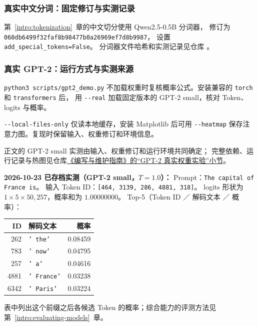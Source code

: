 \subsubsection*{真实中文分词：固定修订与实测记录}
\label{app:tokenizer-record}

第~\ref*{intro:tokenization}~章的中文切分使用 Qwen2.5-0.5B 分词器，
修订为 \nolinkurl{060db6499f32faf8b98477b0a26969ef7d8b9987}，
设置 \texttt{add\_special\_tokens=False}。
分词器文件哈希和实测记录见仓库 。

\subsubsection*{真实 GPT-2：运行方式与实测来源}

\texttt{python3 scripts/gpt2\_demo.py}
不加载权重时复核概率公式。安装兼容的 \texttt{torch} 和 \texttt{transformers} 后，
用 \texttt{-{}-real} 加载固定版本的 GPT-2 small，核对 Token、logits 与概率。

\texttt{-{}-local-files-only} 仅读本地缓存，安装 Matplotlib 后可用
\texttt{-{}-heatmap} 保存注意力图。复现时保留输入、权重修订和环境信息。

正文的 GPT-2 small 实测由输入、权重修订和运行环境共同确定；
完整依赖、运行记录与热图见仓库\href{https://github.com/CoCoThink/ai-by-intuition/blob/main/CONTRIBUTING.md\#gpt-2-\%E7\%9C\%9F\%E5\%AE\%9E\%E6\%9D\%83\%E9\%87\%8D\%E5\%AE\%9E\%E9\%AA\%8C}{《编写与维护指南》的“GPT-2 真实权重实验”小节}。

\textbf{2026-10-23 已存档实测（GPT-2 small，$T=1.0$）：}
Prompt：\texttt{The capital of France is}。
输入 Token ID：\texttt{[464, 3139, 286, 4881, 318]}。
logits 形状为 $1\times5\times50{,}257$，概率和为 $1.00000000$。
Top-5（Token ID ／ 解码文本 ／ 概率）：

\begin{center}\small
{}
\begin{tabularx}{\linewidth}{@{}r>{\raggedright\arraybackslash}Xr@{}}
\toprule
ID & 解码文本 & 概率\\\midrule
262 & \texttt{' the'} & 0.08459\\
783 & \texttt{' now'} & 0.04795\\
257 & \texttt{' a'} & 0.04616\\
4881 & \texttt{' France'} & 0.03238\\
6342 & \texttt{' Paris'} & 0.03224\\
\bottomrule
\end{tabularx}
\end{center}
表中列出这个前缀之后各候选 Token 的概率；综合能力的评测方法见第~\ref*{intro:evaluating-models}~章。
